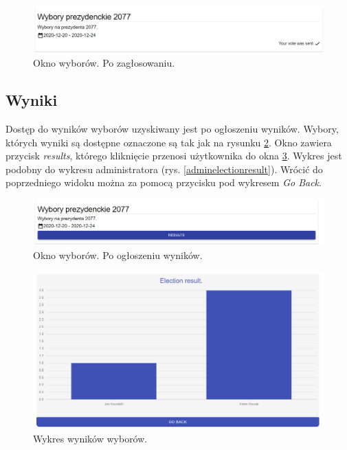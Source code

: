 \documentclass[a4paper,12pt]{book}
\begin{document}
\begin{figure}[H]
	\centering
	\includegraphics[width=\textwidth]{images/votesent.png}
	\caption{Okno wyborów. Po zagłosowaniu.}\label{votesent}
\end {figure}

\subsection{Wyniki}

Dostęp do wyników wyborów uzyskiwany jest po ogłoszeniu wyników. Wybory, których wyniki są dostępne oznaczone są tak jak na rysunku \ref{voterresults}. Okno zawiera przycisk \textit{results}, którego kliknięcie przenosi użytkownika do okna \ref{resultdiagram}. Wykres jest podobny do wykresu administratora (rys. \ref{adminelectionresult}). Wrócić do poprzedniego widoku można za pomocą przycisku pod wykresem \textit{Go Back}.

\begin{figure}[H]
	\centering
	\includegraphics[width=\textwidth]{images/voterresults.png}
	\caption{Okno wyborów. Po ogłoszeniu wyników.}\label{voterresults}
\end {figure}

\begin{figure}[H]
	\centering
	\includegraphics[width=\textwidth]{images/resultdiagram.png}
	\caption{Wykres wyników wyborów.}\label{resultdiagram}
\end {figure}
\end{document}

